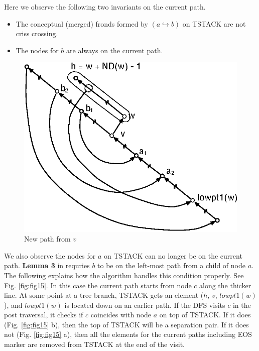 \documentclass[twoside,twocolumn]{article}
\begin{document}
Here we observe the following two invariants on the current path.
\begin{itemize}
\item The conceptual (merged) fronds formed by $(a \hookrightarrow b)$ on {\ttfamily TSTACK} are not criss crossing.
\item The nodes for $b$ are always on the current path.
\end{itemize}

\begin{figure}[!htb]
\centering
\includegraphics[scale=1.0]{spqr_fig14.eps}
\caption{New path from $v$}
\label{fig:fig14}
\end{figure}


We also observe the nodes for $a$ on {\ttfamily TSTACK} can no longer be on the current path.
{\bf Lemma 3} in \cite{GM01} requries $b$ to be on the left-most path from a child of node $a$.
The following explains how the algorithm handles this condition properly.
See Fig. \ref{fig:fig15}. In this case the current path starts from node $c$ along the thicker line. At some point
at a tree branch, {\ttfamily TSTACK} gets an element ($h$, $v$, $lowpt1(w)$), and $lowpt1(w)$ is located down on an earlier path.
If the DFS visits $c$ in the post traversal, it checks if $c$ coincides with node $a$ on top of {\ttfamily TSTACK}.
If it does (Fig. \ref{fig:fig15} b), then the top of {\ttfamily TSTACK} will be a separation pair. If it does not (Fig. \ref{fig:fig15} a),
then all the elements for the current paths including {\ttfamily EOS} marker are removed from {\ttfamily TSTACK} at the end of the visit.
\end{document}
